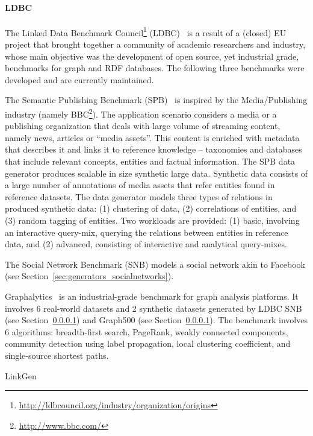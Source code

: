 \paragraph{LDBC}  The Linked Data Benchmark Council\footnote{\url{http://ldbcouncil.org/industry/organization/origins}} (LDBC)~\cite{Angles:2014:LDB:2627692.2627697} is a result of a (closed) EU project that brought together a community of academic researchers and industry, whose main objective was the development of open source, yet industrial grade, benchmarks for graph and RDF databases. The following three benchmarks were developed and are currently maintained.


The Semantic Publishing Benchmark (SPB)~\cite{spb} is inspired by the Media/Publishing industry (namely BBC\footnote{\url{http://www.bbc.com/}}). The application scenario considers a media or a publishing organization that deals with large volume of streaming content, namely news, articles or  ``media assets''. This content is enriched with metadata that describes it and links it to reference knowledge -- taxonomies and databases that include relevant concepts, entities and factual information. The SPB data generator produces scalable in size synthetic large data. Synthetic data consists of a large number of annotations of media assets that refer entities found in reference datasets. The data generator models three types of relations in produced synthetic data: (1) clustering of data, (2) correlations of entities, and (3) random tagging of entities. Two workloads are provided: (1) basic, involving an interactive query-mix, querying the relations between entities in reference data, and (2) advanced,  consisting of interactive and analytical query-mixes.

The Social Network Benchmark (SNB) models a social network akin to Facebook (see Section~\ref{sec:generators_socialnetworks}).

Graphalytics~\cite{Iosup:2016:LGB:3007263.3007270} is an industrial-grade benchmark for graph analysis platforms. It involves 6 real-world datasets and 2 synthetic datasets generated by LDBC SNB (see Section~\ref{}) and Graph500 (see Section~\ref{}). The benchmark involves 6 algorithms: breadth-first search, PageRank, weakly connected components, community detection using label propagation, local clustering coefficient, and single-source shortest paths.

LinkGen~\cite{10.1007/978-3-319-46547-0_12}


